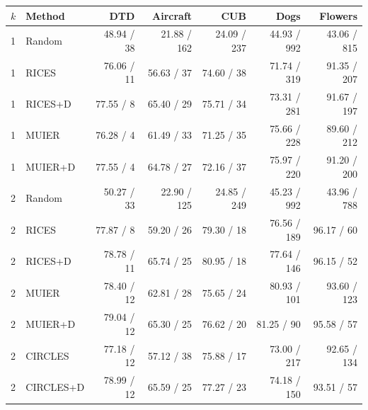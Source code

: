 \begin{tabular}{llrrrrr}
\toprule
$k$ & Method & DTD & Aircraft & CUB & Dogs & Flowers \\
\midrule
1 & Random & 48.94 / 38 & 21.88 / 162 & 24.09 / 237 & 44.93 / 992 & 43.06 / 815 \\
1 & RICES & 76.06 / 11 & 56.63 / 37 & 74.60 / 38 & 71.74 / 319 & 91.35 / 207 \\
1 & RICES+D & 77.55 / 8 & 65.40 / 29 & 75.71 / 34 & 73.31 / 281 & 91.67 / 197 \\
1 & MUIER & 76.28 / 4 & 61.49 / 33 & 71.25 / 35 & 75.66 / 228 & 89.60 / 212 \\
1 & MUIER+D & 77.55 / 4 & 64.78 / 27 & 72.16 / 37 & 75.97 / 220 & 91.20 / 200 \\
2 & Random & 50.27 / 33 & 22.90 / 125 & 24.85 / 249 & 45.23 / 992 & 43.96 / 788 \\
2 & RICES & 77.87 / 8 & 59.20 / 26 & 79.30 / 18 & 76.56 / 189 & 96.17 / 60 \\
2 & RICES+D & 78.78 / 11 & 65.74 / 25 & 80.95 / 18 & 77.64 / 146 & 96.15 / 52 \\
2 & MUIER & 78.40 / 12 & 62.81 / 28 & 75.65 / 24 & 80.93 / 101 & 93.60 / 123 \\
2 & MUIER+D & 79.04 / 12 & 65.30 / 25 & 76.62 / 20 & 81.25 / 90 & 95.58 / 57 \\
2 & CIRCLES & 77.18 / 12 & 57.12 / 38 & 75.88 / 17 & 73.00 / 217 & 92.65 / 134 \\
2 & CIRCLES+D & 78.99 / 12 & 65.59 / 25 & 77.27 / 23 & 74.18 / 150 & 93.51 / 57 \\
\bottomrule
\end{tabular}
